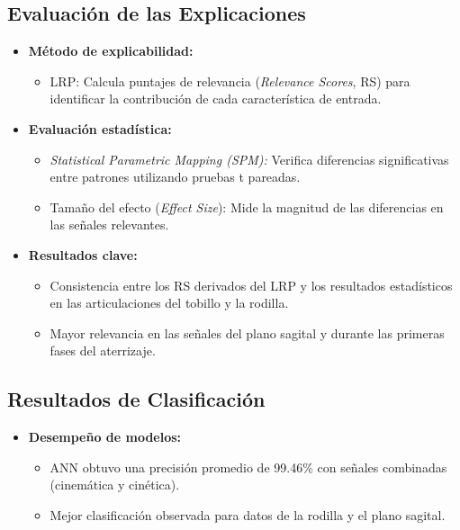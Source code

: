 \documentclass{report}
\begin{document}
\subsection{Evaluación de las Explicaciones}
\begin{itemize}
    \item \textbf{Método de explicabilidad:} 
    \begin{itemize}
        \item LRP: Calcula puntajes de relevancia (\textit{Relevance Scores}, RS) para identificar la contribución de cada característica de entrada.
    \end{itemize}
    \item \textbf{Evaluación estadística:}
    \begin{itemize}
        \item \textit{Statistical Parametric Mapping (SPM):} Verifica diferencias significativas entre patrones utilizando pruebas t pareadas.
        \item Tamaño del efecto (\textit{Effect Size}): Mide la magnitud de las diferencias en las señales relevantes.
    \end{itemize}
    \item \textbf{Resultados clave:}
    \begin{itemize}
        \item Consistencia entre los RS derivados del LRP y los resultados estadísticos en las articulaciones del tobillo y la rodilla.
        \item Mayor relevancia en las señales del plano sagital y durante las primeras fases del aterrizaje.
    \end{itemize}
\end{itemize}

\subsection{Resultados de Clasificación}
\begin{itemize}
    \item \textbf{Desempeño de modelos:}
    \begin{itemize}
        \item ANN obtuvo una precisión promedio de 99.46\% con señales combinadas (cinemática y cinética).
        \item Mejor clasificación observada para datos de la rodilla y el plano sagital.
    \end{itemize}
\end{itemize}
\end{document}
